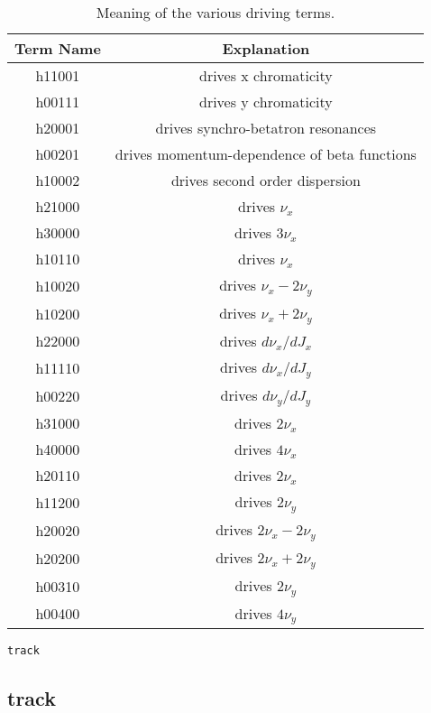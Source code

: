 \documentclass[11pt]{article}
\begin{document}
\begin{table}[htb]\caption{Meaning of the various driving terms\cite{Bengtsson}.}
\begin{center}
\begin{tabular}{|c|c|}\hline
Term Name & Explanation \\  \hline \hline
h11001 & drives x chromaticity \\ \hline
h00111 & drives y chromaticity \\ \hline
h20001 & drives synchro-betatron resonances \\ \hline
h00201 & drives momentum-dependence of beta functions \\ \hline
h10002 & drives second order dispersion \\ \hline
h21000 & drives $\nu_x$ \\ \hline
h30000 & drives $3 \nu_x$ \\ \hline
h10110 & drives $\nu_x$ \\ \hline
h10020 & drives $\nu_x - 2 \nu_y$ \\ \hline
h10200 & drives $\nu_x + 2 \nu_y$ \\ \hline
h22000 & drives $d\nu_x/dJ_x$\\ \hline
h11110 & drives $d\nu_x/dJ_y$ \\ \hline
h00220 & drives $d\nu_y/dJ_y$ \\ \hline
h31000 & drives $2 \nu_x$ \\ \hline
h40000 & drives $4 \nu_x$ \\ \hline
h20110 & drives $2 \nu_x$ \\ \hline
h11200 & drives $2 \nu_y$ \\ \hline
h20020 & drives $2 \nu_x - 2 \nu_y$ \\ \hline
h20200 & drives $2 \nu_x + 2 \nu_y$ \\ \hline
h00310 & drives $2 \nu_y$ \\ \hline
h00400 & drives $4 \nu_y$ \\ \hline
\end{tabular}
\end{center}
\label{tab:drivingTerms}
\end{table}

\newpage
\begin{center}{\Large\verb|track|}\end{center}
\subsection{track \label{subsec:track}}
\end{document}
